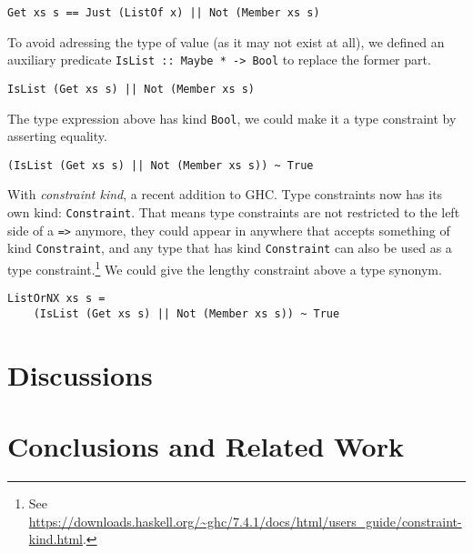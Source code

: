 \documentclass[pldi]{sigplanconf-pldi16}
\begin{document}
\begin{verbatim}
Get xs s == Just (ListOf x) || Not (Member xs s)
\end{verbatim}

To avoid adressing the type of value (as it may not exist at all), we defined an
 auxiliary predicate \texttt{IsList :: Maybe * -> Bool} to replace
 the former part.

\begin{verbatim}
IsList (Get xs s) || Not (Member xs s)
\end{verbatim}

The type expression above has kind \texttt{Bool}, we could make it
 a type constraint by asserting equality.

\begin{verbatim}
(IsList (Get xs s) || Not (Member xs s)) ~ True
\end{verbatim}

With \emph{constraint kind}, a recent addition to GHC. Type constraints now has
its own kind: \texttt{Constraint}. That means type constraints
are not restricted to the left side of a \texttt{=>} anymore,
they could appear in anywhere that accepts something of kind
\texttt{Constraint}, and any type that has kind
\texttt{Constraint} can also be used as a type constraint.\footnote{See \url{https://downloads.haskell.org/~ghc/7.4.1/docs/html/users_guide/constraint-kind.html}.}
We could give the lengthy constraint above a type synonym.

\begin{verbatim}
ListOrNX xs s =
    (IsList (Get xs s) || Not (Member xs s)) ~ True
\end{verbatim}

\section{Discussions}

\section{Conclusions and Related Work}




\end{document}
